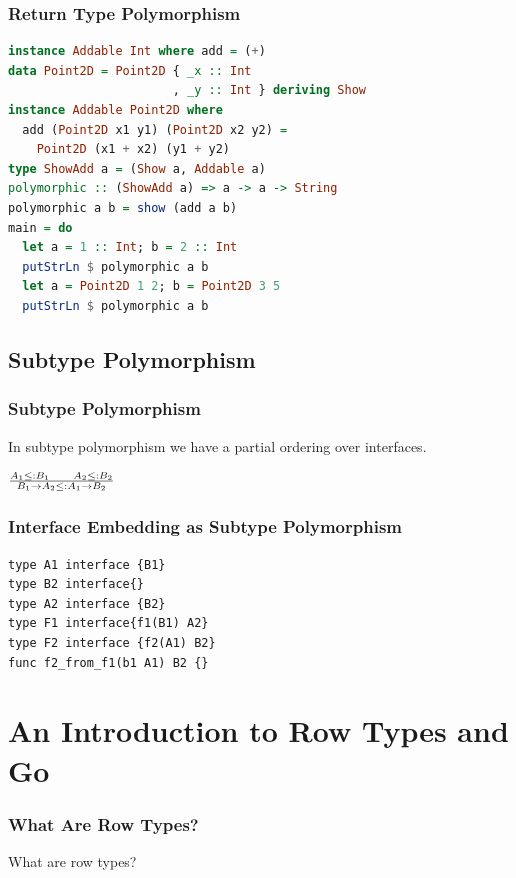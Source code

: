 \documentclass{beamer}
\newcommand{\hugecenter}[1]{\begin{center}\begin{huge}#1\end{huge}\end{center}}
\begin{document}
\begin{frame}[fragile]
  \frametitle{Return Type Polymorphism}
\begin{lstlisting}[language=Haskell]
% class Addable a where add :: a -> a -> a
instance Addable Int where add = (+)
data Point2D = Point2D { _x :: Int
                       , _y :: Int } deriving Show
instance Addable Point2D where
  add (Point2D x1 y1) (Point2D x2 y2) =
    Point2D (x1 + x2) (y1 + y2)
type ShowAdd a = (Show a, Addable a)
polymorphic :: (ShowAdd a) => a -> a -> String
polymorphic a b = show (add a b)
main = do
  let a = 1 :: Int; b = 2 :: Int
  putStrLn $ polymorphic a b
  let a = Point2D 1 2; b = Point2D 3 5
  putStrLn $ polymorphic a b
\end{lstlisting}
\end{frame}

\subsection{Subtype Polymorphism}
\begin{frame}
  \frametitle{Subtype Polymorphism}
  In subtype polymorphism we have a partial ordering over interfaces.
  \begin{huge}
    \begin{center}
      \begin{math}
        \frac{A_1 \leq: B_1 \hspace{6mm} A_2 \leq: B_2}
        {B_1 \rightarrow A_2 \leq: A_1 \rightarrow B_2}
      \end{math}
    \end{center}
  \end{huge}
\end{frame}

\begin{frame}[fragile]
  \frametitle{Interface Embedding as Subtype Polymorphism}
\begin{lstlisting}[language=Golang]
% type B1 interface{}
type A1 interface {B1}
type B2 interface{}
type A2 interface {B2}
type F1 interface{f1(B1) A2}
type F2 interface {f2(A1) B2}
func f2_from_f1(b1 A1) B2 {}
\end{lstlisting}
\end{frame}

\section{An Introduction to Row Types and Go}

\begin{frame}
  \frametitle{What Are Row Types?}
  \hugecenter{What are row types?}
\end{frame}
\end{document}
